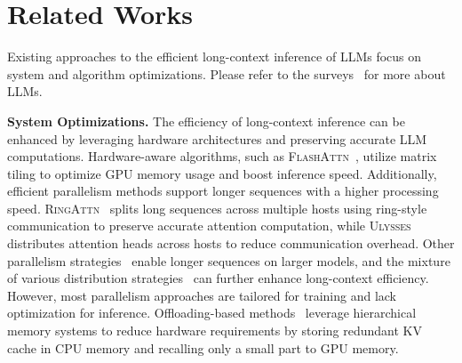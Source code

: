 \section{Related Works}
\vspace{-2pt}
\label{sec:related}

Existing approaches to the efficient long-context inference of LLMs focus on system and algorithm optimizations. Please refer to the surveys~\cite{zhao2023survey, wan2023efficient} for more about LLMs.

\textbf{System Optimizations.}  
The efficiency of long-context inference can be enhanced by leveraging hardware architectures and preserving accurate LLM computations. 
Hardware-aware algorithms, such as \textsc{FlashAttn}~\citep{dao2022flashattention, dao2023flashattention2, shah2024flashattention}, utilize matrix tiling to optimize GPU memory usage and boost inference speed. 
Additionally, efficient parallelism methods support longer sequences with a higher processing speed. 
\textsc{RingAttn}~\citep{li2021sequence} splits long sequences across multiple hosts using ring-style communication to preserve accurate attention computation, while \textsc{Ulysses}~\citep{jacobs2023deepspeed} distributes attention heads across hosts to reduce communication overhead. 
Other parallelism strategies~\citep{narayanan2021efficient, huang2019gpipe, rajbhandari2020zero, sun2024seq1f1b, deepseek-v3} enable longer sequences on larger models, and the mixture of various distribution strategies~\citep{ren2021zero, ao2024burstattention} can further enhance long-context efficiency. 
However, most parallelism approaches are tailored for training and lack optimization for inference. 
Offloading-based methods~\cite{xiao2024infllm, sun2024shadowkv, lee2024infinigen, chen2024magicpig} leverage hierarchical memory systems to reduce hardware requirements by storing redundant KV cache in CPU memory and recalling only a small part to GPU memory.


